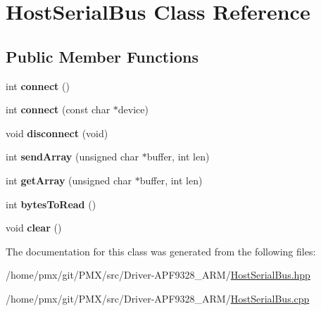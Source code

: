 \hypertarget{classHostSerialBus}{}\section{Host\+Serial\+Bus Class Reference}
\label{classHostSerialBus}
\subsection*{Public Member Functions}
\begin{DoxyCompactItemize}
\item 
\mbox{\label{classHostSerialBus_a05befd02e5f1376b1c5831ff806f7966}} 
int {\bfseries connect} ()
\item 
\mbox{\label{classHostSerialBus_a9fdf5635718cc1f147ac047be18d2281}} 
int {\bfseries connect} (const char $\ast$device)
\item 
\mbox{\label{classHostSerialBus_a2a256d2b8a5174bbc1ab1e395a8e0ec6}} 
void {\bfseries disconnect} (void)
\item 
\mbox{\label{classHostSerialBus_a9cdbbba2018f13ba8408368e37a10b42}} 
int {\bfseries send\+Array} (unsigned char $\ast$buffer, int len)
\item 
\mbox{\label{classHostSerialBus_ab02f3e6e519b622f7e81c5aa6cec4069}} 
int {\bfseries get\+Array} (unsigned char $\ast$buffer, int len)
\item 
\mbox{\label{classHostSerialBus_a5cc7bf0e8fab92e8a1f4d2c893301028}} 
int {\bfseries bytes\+To\+Read} ()
\item 
\mbox{\label{classHostSerialBus_ac550228c33a3734c9f63a4cd76c1e913}} 
void {\bfseries clear} ()
\end{DoxyCompactItemize}


The documentation for this class was generated from the following files\+:\begin{DoxyCompactItemize}
\item 
/home/pmx/git/\+P\+M\+X/src/\+Driver-\/\+A\+P\+F9328\+\_\+\+A\+R\+M/\hyperlink{HostSerialBus_8hpp}{Host\+Serial\+Bus.\+hpp}\item 
/home/pmx/git/\+P\+M\+X/src/\+Driver-\/\+A\+P\+F9328\+\_\+\+A\+R\+M/\hyperlink{HostSerialBus_8cpp}{Host\+Serial\+Bus.\+cpp}\end{DoxyCompactItemize}
